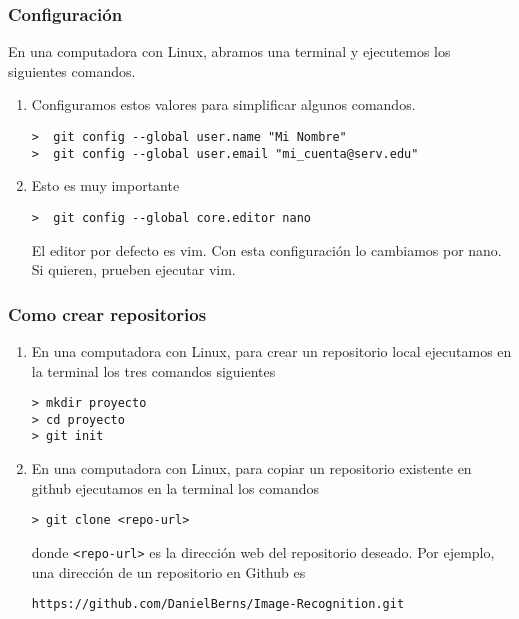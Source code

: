 \documentclass{beamer}
\begin{document}
\begin{frame}[fragile]
\frametitle{Configuraci\'{o}n}

En una computadora con Linux, abramos una terminal y ejecutemos los siguientes comandos.

\begin{enumerate}
\item<1-> Configuramos estos valores para simplificar algunos comandos.
\begin{verbatim}
>  git config --global user.name "Mi Nombre"
>  git config --global user.email "mi_cuenta@serv.edu"
\end{verbatim}

\item<2->Esto es muy importante
\begin{verbatim}
>  git config --global core.editor nano
\end{verbatim}
El editor por defecto es vim. Con esta configuraci\'{o}n lo cambiamos por nano.
Si quieren, prueben ejecutar vim. 
\end{enumerate}

\end{frame}

\begin{frame}[fragile]
\frametitle{Como crear repositorios}

\begin{enumerate}

\item<1-> En una computadora con Linux, para crear un repositorio local ejecutamos en la terminal los tres comandos siguientes
\begin{verbatim}
> mkdir proyecto
> cd proyecto
> git init
\end{verbatim}

\item<2-> En una computadora con Linux, para copiar un repositorio existente en github ejecutamos en la terminal los comandos
\begin{verbatim}
> git clone <repo-url>
\end{verbatim}
donde \verb|<repo-url>| es la direcci\'{o}n web del repositorio deseado.
Por ejemplo, una direcci\'{o}n de un repositorio en Github es
\begin{verbatim}
https://github.com/DanielBerns/Image-Recognition.git
\end{verbatim}
\end{enumerate}

\end{frame}
\end{document}
